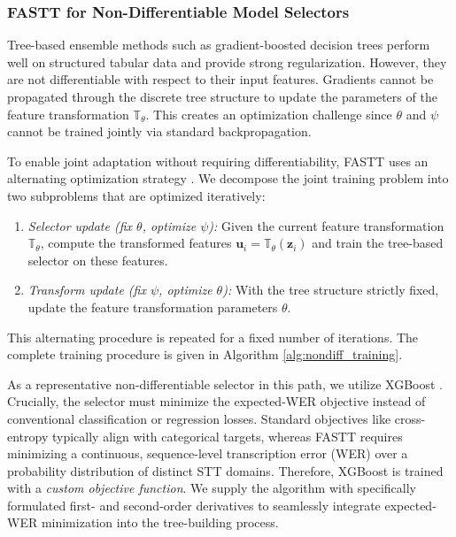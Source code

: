\documentclass[journal]{IEEEtran}
\begin{document}
    \subsubsection{FASTT for Non-Differentiable Model Selectors}
    \label{subsubsec:nondiff_selectors}

    Tree-based ensemble methods such as gradient-boosted decision trees perform
    well on structured tabular data and provide strong regularization.
    However, they are not differentiable with respect to their input features. Gradients cannot be propagated through the discrete tree structure to update the parameters of the feature transformation $\mathbb{T}_{\theta}$. This creates an optimization challenge since $\theta$ and $\psi$ cannot be trained jointly via standard backpropagation.

    To enable joint adaptation without requiring differentiability, FASTT uses an alternating optimization strategy \cite{bertsekas1999nonlinear}. We decompose the joint training problem into two subproblems that are optimized iteratively:
    
    \begin{enumerate}
        \item \emph{Selector update (fix $\theta$, optimize $\psi$):} Given the
            current feature transformation $\mathbb{T}_{\theta}$, compute the transformed
            features $\mathbf{u}_{i}= \mathbb{T}_{\theta}(\mathbf{z}_{i})$ and train
            the tree-based selector on these features.
            
        \item \emph{Transform update (fix $\psi$, optimize $\theta$):} With the
            tree structure strictly fixed, update the feature transformation parameters $\theta$. 
    \end{enumerate}

    This alternating procedure is repeated for a fixed number of iterations. The complete training procedure is given in Algorithm \ref{alg:nondiff_training}.

    As a representative non-differentiable selector in this path, we utilize XGBoost \cite{chen2016xgboost}. Crucially, the selector must minimize the expected-WER objective instead of conventional classification or regression losses. Standard objectives like cross-entropy typically align with categorical targets, whereas FASTT requires minimizing a continuous, sequence-level transcription error (WER) over a probability distribution of distinct STT domains. Therefore, XGBoost is trained with a \emph{custom objective function}. We supply the algorithm with specifically formulated first- and second-order derivatives to seamlessly integrate expected-WER minimization into the tree-building process.
    
\end{document}
